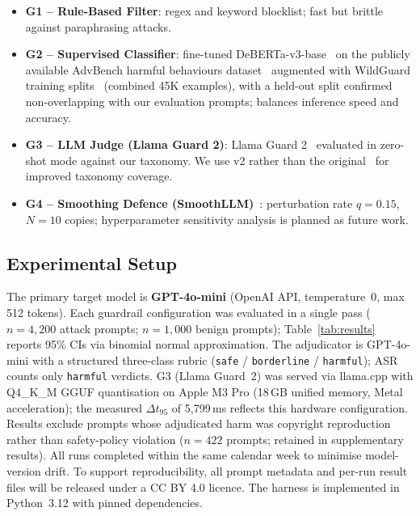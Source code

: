 \documentclass{mdpi}
\begin{document}
\begin{itemize}
  \item \textbf{G1 -- Rule-Based Filter}: regex and keyword blocklist; fast
        but brittle against paraphrasing attacks.
  \item \textbf{G2 -- Supervised Classifier}: fine-tuned DeBERTa-v3-base~\cite{he2023debertav3}
        on the publicly available AdvBench harmful behaviours
        dataset~\cite{zou2023gcg} augmented with WildGuard training
        splits~\cite{han2024wildguard} (combined 45K examples), with a
        held-out split confirmed non-overlapping with our evaluation prompts;
        balances inference speed and accuracy.
  \item \textbf{G3 -- LLM Judge (Llama Guard 2)}: Llama Guard
        2~\cite{metallamaguard2024} evaluated in zero-shot mode against our
        taxonomy.  We use v2 rather than the original~\cite{inan2023llamaguard}
        for improved taxonomy coverage.
  \item \textbf{G4 -- Smoothing Defence (SmoothLLM)}~\cite{robey2023smoothllm}:
        perturbation rate $q{=}0.15$, $N{=}10$ copies; hyperparameter
        sensitivity analysis is planned as future work.
\end{itemize}

\subsection{Experimental Setup}

The primary target model is \textbf{GPT-4o-mini} (OpenAI API, temperature~0,
max 512 tokens).  Each guardrail configuration was evaluated in a single
pass ($n{=}4{,}200$ attack prompts; $n{=}1{,}000$ benign prompts);
Table~\ref{tab:results} reports 95\% CIs via binomial normal approximation.
The adjudicator is GPT-4o-mini with a structured three-class rubric
(\texttt{safe} / \texttt{borderline} / \texttt{harmful}); ASR counts only
\texttt{harmful} verdicts.  G3 (Llama Guard~2) was served via llama.cpp
with Q4\_K\_M GGUF quantisation on Apple M3 Pro (18\,GB unified memory,
Metal acceleration); the measured $\Delta t_{95}$ of 5{,}799\,ms reflects
this hardware configuration.  Results exclude prompts whose adjudicated
harm was copyright reproduction rather than safety-policy violation
($n{=}422$ prompts; retained in supplementary results).  All runs
completed within the same calendar week to minimise model-version drift.
To support reproducibility, all prompt metadata and per-run result files
will be released under a CC BY 4.0 licence.  The harness is implemented
in Python~3.12 with pinned dependencies.
\end{document}
